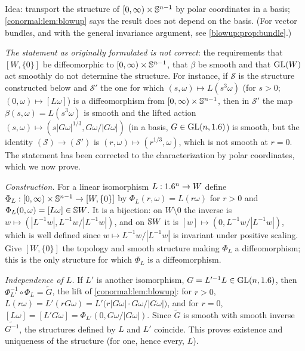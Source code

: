\subsection*{}
Idea: transport the structure of $[0,\infty)\times\mathbb{S}^{n-1}$ by polar coordinates in a
basis; \cref{conormal:lem:blowup} says the result does not depend on the basis.
(For vector bundles, and with the general invariance argument, see
\cref{blowup:prop:bundle}.)

\emph{The statement as originally formulated is not correct}: the requirements that
$[W,\{0\}]$ be diffeomorphic to $[0,\infty)\times\mathbb{S}^{n-1}$, that $\beta$ be smooth and
that $\operatorname{GL}(W)$ act smoothly do not determine the structure. For instance, if $\mathcal S$ is
the structure constructed below and $\mathcal S'$ the one for which $(s,\omega)\mapsto
L(s^3\omega)$ (for $s>0$; $(0,\omega)\mapsto[L\omega]$) is a diffeomorphism from
$[0,\infty)\times\mathbb{S}^{n-1}$, then in $\mathcal S'$ the map $\beta(s,\omega)=
L(s^3\omega)$ is smooth and the lifted action $(s,\omega)\mapsto(s|G\omega|^{1/3},G\omega/
|G\omega|)$ (in a basis, $G\in\operatorname{GL}(n,1.6)$) is smooth, but the identity
$(\mathcal S)\to(\mathcal S')$ is $(r,\omega)\mapsto(r^{1/3},\omega)$, which is not smooth
at $r=0$. The statement has been corrected to the characterization by polar coordinates,
which we now prove.

\emph{Construction.} For a linear isomorphism $L:1.6^n\to W$ define
$\Phi_L:[0,\infty)\times\mathbb{S}^{n-1}\to[W,\{0\}]$ by $\Phi_L(r,\omega)=L(r\omega)$ for $r>0$
and $\Phi_L(0,\omega)=[L\omega]\in\mathbb{S} W$. It is a bijection: on $W\setminus0$ the inverse
is $w\mapsto(|L^{-1}w|,L^{-1}w/|L^{-1}w|)$, and on $\mathbb{S} W$ it is $[w]\mapsto(0,L^{-1}w/
|L^{-1}w|)$, which is well defined since $w\mapsto L^{-1}w/|L^{-1}w|$ is invariant under
positive scaling. Give $[W,\{0\}]$ the topology and smooth structure making $\Phi_L$ a
diffeomorphism; this is the only structure for which $\Phi_L$ is a diffeomorphism.

\emph{Independence of $L$.} If $L'$ is another isomorphism, $G=L'^{-1}L\in\operatorname{GL}(n,1.6)$, then
$\Phi_{L'}^{-1}\circ\Phi_L=\tilde G$, the lift of \cref{conormal:lem:blowup}: for $r>0$,
$L(r\omega)=L'(rG\omega)=L'\big(r|G\omega|\cdot G\omega/|G\omega|\big)$, and for $r=0$,
$[L\omega]=[L'G\omega]=\Phi_{L'}(0,G\omega/|G\omega|)$. Since $\tilde G$ is smooth with smooth
inverse $\widetilde{G^{-1}}$, the structures defined by $L$ and $L'$ coincide. This proves
existence and uniqueness of the structure (for one, hence every, $L$).

